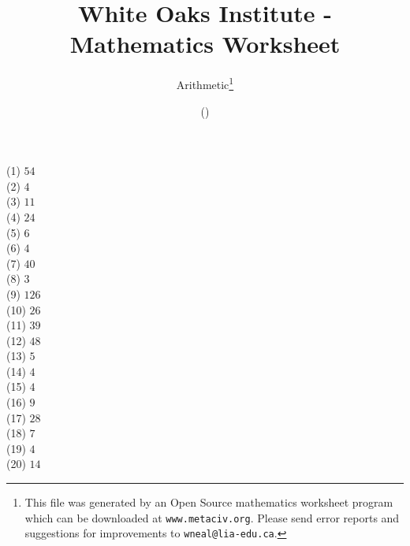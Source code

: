 \documentclass[letter]{article}
\begin{document}
\title{White Oaks Institute - Mathematics Worksheet}
\author{Arithmetic\thanks{This file was generated by an \textsf{Open Source} mathematics worksheet program which can be downloaded at \texttt{www.metaciv.org}. Please send error reports and suggestions for improvements to \texttt{wneal@lia-edu.ca}.}}
\date{\XCfileversion{} (\XCfiledate)}
\maketitle
\setlength{\parskip}{12mm plus 4mm minus 4mm}\setlength{\parindent}{0cm}\begin{multicols}{2}(1) $54$\\(2) $4$\\(3) $11$\\(4) $24$\\(5) $6$\\(6) $4$\\(7) $40$\\(8) $3$\\(9) $126$\\(10) $26$\\(11) $39$\\(12) $48$\\(13) $5$\\(14) $4$\\(15) $4$\\(16) $9$\\(17) $28$\\(18) $7$\\(19) $4$\\(20) $14$\\\end{multicols}
\end{document}
